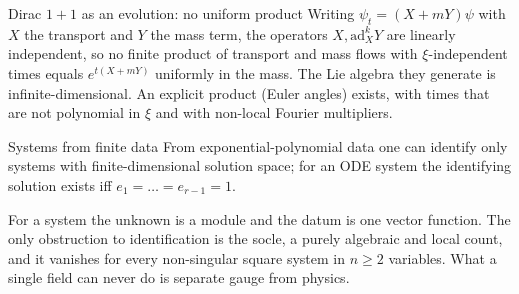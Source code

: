 \begin{proposition}{Dirac $1+1$ as an evolution: no uniform product  \proved}\label{prop:syse}
Writing $\psi_t=(X+mY)\psi$ with $X$ the transport and $Y$ the mass term, the operators $X,\mathrm{ad}_X^kY$ are linearly independent, so no finite product of transport and mass flows with $\xi$-independent times equals $e^{t(X+mY)}$ uniformly in the mass. The Lie algebra they generate is infinite-dimensional. An explicit product (Euler angles) exists, with times that are not polynomial in $\xi$ and with non-local Fourier multipliers.
\end{proposition}

\begin{proposition}{Systems from finite data  \proved}\label{thm:sysr1}
From exponential-polynomial data one can identify only systems with finite-dimensional solution space; for an ODE system the identifying solution exists iff $e_1=\dots=e_{r-1}=1$.
\end{proposition}

\begin{takeaway}
For a system the unknown is a module and the datum is one vector function. The only obstruction to identification is the socle, a purely algebraic and local count, and it vanishes for every non-singular square system in $n\ge2$ variables. What a single field can never do is separate gauge from physics.
\end{takeaway}
